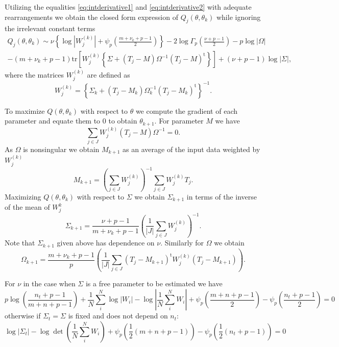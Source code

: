 \documentclass[english,listof=totoc]{scrartcl}
\begin{document}
Utilizing the equalities \eqref{eq:intderivative1} and \eqref{eq:intderivative2} with adequate rearrangements we obtain the closed form expression of $Q_j(\theta,\theta_k)$ while ignoring the irrelevant constant terms
\begin{equation}
\begin{split}Q_j(\theta,\theta_k) \sim \nu\left\{\log|W_j^{(k)}|+\psi_{p}\left(\frac{m+\nu_k+p-1}{2}\right)\right\}-2\log\Gamma_{p}\left(\frac{\nu+p-1}{2}\right)-p\log|\Omega|\\
-(m+\nu_k+p-1)\textrm{tr}\left[W_j^{(k)}\left\{\Sigma+(T_j-M)\Omega^{-1}(T_j-M)^{\textrm{t}}\right\}\right]+(\nu+p-1)\log |\Sigma|,
\end{split}
\label{eq:fsimp}
\end{equation}
where the matrices $W_j^{(k)}$ are defined as
\begin{equation}
W_j^{(k)}=\left\{\Sigma_k+(T_j-M_k)\Omega_k^{-1}(T_j-M_k)^{\textrm{t}}\right\}^{-1}.
\end{equation}

To maximize $Q(\theta,\theta_k)$ with respect to $\theta$ we compute the gradient of each parameter and equate them to $0$ to obtain $\theta_{k+1}$. For parameter $M$ we have
\begin{equation}
\sum_{j\in J}W_j^{(k)}\left(T_j-M\right)\Omega^{-1}=0.
\end{equation}
As $\Omega$ is nonsingular we obtain $M_{k+1}$ as an average of the input data weighted by $W_j^{(k)}$
\begin{equation}
M_{k+1}=\left(\sum_{j\in J}W_j^{(k)}\right)^{-1}\sum_{j\in J}W_j^{(k)}T_j.
\end{equation}
Maximizing $Q(\theta,\theta_k)$ with respect to $\Sigma$ we obtain $\Sigma_{k+1}$ in terms of the inverse of the mean of $W_j^{{k}}$
\begin{equation}
\Sigma_{k+1}=\frac{\nu+p-1}{m+\nu_k+p-1}\left(\frac{1}{|J|}\sum_{j\in J}W_j^{(k)}\right)^{-1}. 
\end{equation}
Note that $\Sigma_{k+1}$ given above has dependence on $\nu$. Similarly for $\Omega$ we obtain
\begin{equation}
\Omega_{k+1}=\frac{m+\nu_k+p-1}{p}\left(\frac{1}{|J|}\sum_{j\in J}(T_j-M_{k+1})^{\textrm{t}}W_j^{(k)}(T_j-M_{k+1})\right).
\end{equation}

For $\nu$ in the case when $\Sigma$ is a free parameter to be estimated we have
\begin{equation}
p\log\left(\frac{n_{t}+p-1}{m+n+p-1}\right)+\frac{1}{N}\sum_{i}^{N}\log|W_{i}|-\log\left|\frac{1}{N}\sum_{i}^{N}W_{i}\right|+\psi_{p}\left(\frac{m+n+p-1}{2}\right)-\psi_{p}\left(\frac{n_{t}+p-1}{2}\right)=0
\end{equation}
otherwise if $\Sigma_{t}=\Sigma$ is fixed and does not depend on
$n_{t}$:
\begin{equation}
\log|\Sigma_{t}|-\log\det\left(\frac{1}{N}\sum_{i}^{N}W_{i}\right)+\psi_{p}(\frac{1}{2}(m+n+p-1))-\psi_{p}(\frac{1}{2}(n_{t}+p-1))=0
\end{equation}
\end{document}
